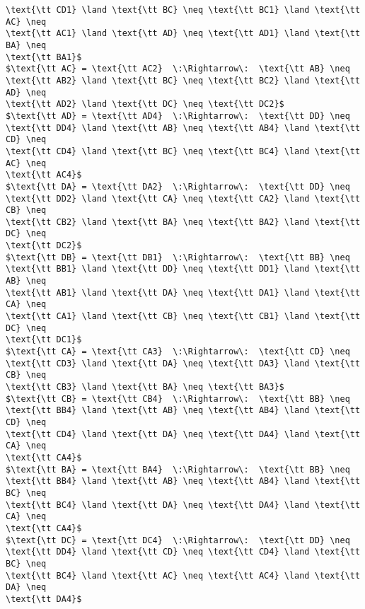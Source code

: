\begin{lstlisting}[mathescape=true, numbers=none, frame=none]
\text{\tt CD1} \land \text{\tt BC} \neq \text{\tt BC1} \land \text{\tt AC} \neq
\text{\tt AC1} \land \text{\tt AD} \neq \text{\tt AD1} \land \text{\tt BA} \neq
\text{\tt BA1}$
$\text{\tt AC} = \text{\tt AC2}  \:\Rightarrow\:  \text{\tt AB} \neq
\text{\tt AB2} \land \text{\tt BC} \neq \text{\tt BC2} \land \text{\tt AD} \neq
\text{\tt AD2} \land \text{\tt DC} \neq \text{\tt DC2}$
$\text{\tt AD} = \text{\tt AD4}  \:\Rightarrow\:  \text{\tt DD} \neq
\text{\tt DD4} \land \text{\tt AB} \neq \text{\tt AB4} \land \text{\tt CD} \neq
\text{\tt CD4} \land \text{\tt BC} \neq \text{\tt BC4} \land \text{\tt AC} \neq
\text{\tt AC4}$
$\text{\tt DA} = \text{\tt DA2}  \:\Rightarrow\:  \text{\tt DD} \neq
\text{\tt DD2} \land \text{\tt CA} \neq \text{\tt CA2} \land \text{\tt CB} \neq
\text{\tt CB2} \land \text{\tt BA} \neq \text{\tt BA2} \land \text{\tt DC} \neq
\text{\tt DC2}$
$\text{\tt DB} = \text{\tt DB1}  \:\Rightarrow\:  \text{\tt BB} \neq
\text{\tt BB1} \land \text{\tt DD} \neq \text{\tt DD1} \land \text{\tt AB} \neq
\text{\tt AB1} \land \text{\tt DA} \neq \text{\tt DA1} \land \text{\tt CA} \neq
\text{\tt CA1} \land \text{\tt CB} \neq \text{\tt CB1} \land \text{\tt DC} \neq
\text{\tt DC1}$
$\text{\tt CA} = \text{\tt CA3}  \:\Rightarrow\:  \text{\tt CD} \neq
\text{\tt CD3} \land \text{\tt DA} \neq \text{\tt DA3} \land \text{\tt CB} \neq
\text{\tt CB3} \land \text{\tt BA} \neq \text{\tt BA3}$
$\text{\tt CB} = \text{\tt CB4}  \:\Rightarrow\:  \text{\tt BB} \neq
\text{\tt BB4} \land \text{\tt AB} \neq \text{\tt AB4} \land \text{\tt CD} \neq
\text{\tt CD4} \land \text{\tt DA} \neq \text{\tt DA4} \land \text{\tt CA} \neq
\text{\tt CA4}$
$\text{\tt BA} = \text{\tt BA4}  \:\Rightarrow\:  \text{\tt BB} \neq
\text{\tt BB4} \land \text{\tt AB} \neq \text{\tt AB4} \land \text{\tt BC} \neq
\text{\tt BC4} \land \text{\tt DA} \neq \text{\tt DA4} \land \text{\tt CA} \neq
\text{\tt CA4}$
$\text{\tt DC} = \text{\tt DC4}  \:\Rightarrow\:  \text{\tt DD} \neq
\text{\tt DD4} \land \text{\tt CD} \neq \text{\tt CD4} \land \text{\tt BC} \neq
\text{\tt BC4} \land \text{\tt AC} \neq \text{\tt AC4} \land \text{\tt DA} \neq
\text{\tt DA4}$
\end{lstlisting}

